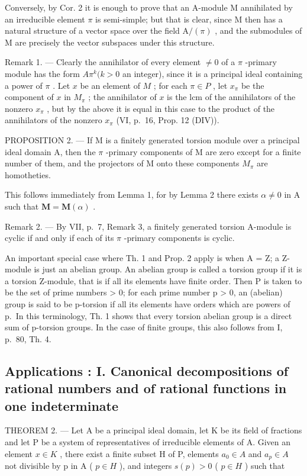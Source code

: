 Conversely, by Cor. 2 it is enough to prove that an A-module M annihilated by an irreducible element \(\pi\) is semi-simple; but that is clear, since M then has a natural structure of a vector space over the field \(\mathrm{A}/(\pi)\) , and the submodules of M are precisely the vector subspaces under this structure.

Remark 1. --- Clearly the annihilator of every element \(\neq 0\) of a \(\pi\) -primary module has the form \(A\pi^k (k > 0\) an integer), since it is a principal ideal containing a power of \(\pi\) . Let \(x\) be an element of \(M\) ; for each \(\pi \in P\) , let \(x_{\pi}\) be the component of \(x\) in \(M_{\pi}\) ; the annihilator of \(x\) is the lcm of the annihilators of the nonzero \(x_{\pi}\) , but by the above it is equal in this case to the product of the annihilators of the nonzero \(x_{\pi}\) (VI, p.~16, Prop. 12 (DIV)).

PROPOSITION 2. --- If M is a finitely generated torsion module over a principal ideal domain A, then the \(\pi\) -primary components of M are zero except for a finite number of them, and the projectors of M onto these components \(M_{\pi}\) are homotheties.

This follows immediately from Lemma 1, for by Lemma 2 there exists \(\alpha \neq 0\) in A such that \(\mathbf{M} = \mathbf{M}(\alpha)\) .

Remark 2. --- By VII, p.~7, Remark 3, a finitely generated torsion A-module is cyclic if and only if each of its \(\pi\) -primary components is cyclic.

An important special case where Th. 1 and Prop. 2 apply is when A = Z; a Z-module is just an abelian group. An abelian group is called a torsion group if it is a torsion Z-module, that is if all its elements have finite order. Then P is taken to be the set of prime numbers \textgreater{} 0; for each prime number p \textgreater{} 0, an (abelian) group is said to be p-torsion if all its elements have orders which are powers of p.~In this terminology, Th. 1 shows that every torsion abelian group is a direct sum of p-torsion groups. In the case of finite groups, this also follows from I, p.~80, Th. 4.

\subsection{Applications : I. Canonical decompositions of rational numbers and of rational functions in one indeterminate}

THEOREM 2. --- Let A be a principal ideal domain, let K be its field of fractions and let P be a system of representatives of irreducible elements of A. Given an element \(x \in K\) , there exist a finite subset H of P, elements \(a_{0} \in A\) and \(a_{p} \in A\) not divisible by p in A ( \(p \in H\) ), and integers \(s(p) > 0\) ( \(p \in H\) ) such that

